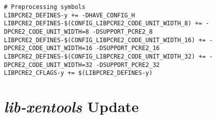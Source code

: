 \begin{lstlisting}
# Preprocessing symbols
LIBPCRE2_DEFINES-y += -DHAVE_CONFIG_H
LIBPCRE2_DEFINES-$(CONFIG_LIBPCRE2_CODE_UNIT_WIDTH_8) += -DPCRE2_CODE_UNIT_WIDTH=8 -DSUPPORT_PCRE2_8
LIBPCRE2_DEFINES-$(CONFIG_LIBPCRE2_CODE_UNIT_WIDTH_16) += -DPCRE2_CODE_UNIT_WIDTH=16 -DSUPPORT_PCRE2_16
LIBPCRE2_DEFINES-$(CONFIG_LIBPCRE2_CODE_UNIT_WIDTH_32) += -DPCRE2_CODE_UNIT_WIDTH=32 -DSUPPORT_PCRE2_32
LIBPCRE2_CFLAGS-y += $(LIBPCRE2_DEFINES-y)
\end{lstlisting}

\section{\textit{lib-xentools} Update}
